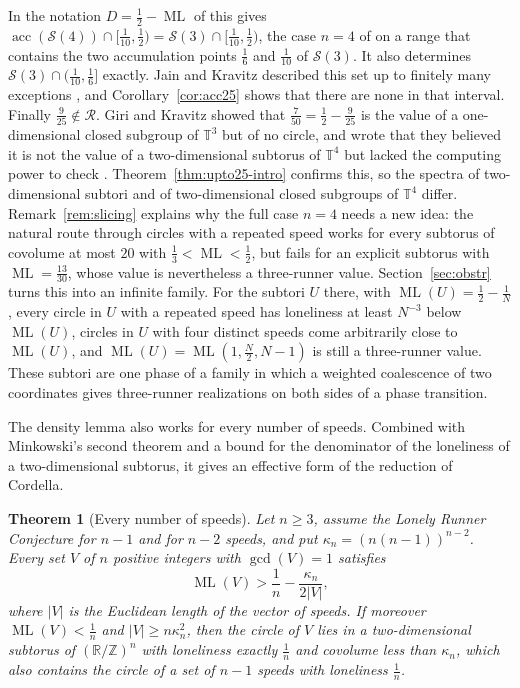 \documentclass[12pt]{amsart}
\newtheorem{theorem}{Theorem}[section]
\theoremstyle{definition}\newtheorem{definition}[theorem]{Definition}
\theoremstyle{remark}\newtheorem{remark}[theorem]{Remark}
\newcommand{\Z}{\mathbb Z}\newcommand{\R}{\mathbb R}\newcommand{\T}{\mathbb T}
\newcommand{\ML}{\operatorname{ML}}
\newcommand{\eucl}[1]{\lvert #1\rvert}
\begin{document}
In the notation $D=\frac12-\ML$ of \cite{GiriKravitz} this gives $\operatorname{acc}(\mathcal S(4))\cap[\frac1{10},\frac12)=\mathcal S(3)\cap[\frac1{10},\frac12)$, the case $n=4$ of \cite[Conjecture~1.5]{GiriKravitz} on a range that contains the two accumulation points $\frac16$ and $\frac1{10}$ of $\mathcal S(3)$. It also determines $\mathcal S(3)\cap(\frac1{10},\frac16]$ exactly. Jain and Kravitz described this set up to finitely many exceptions \cite[Theorem~1.4]{JainKravitz}, and Corollary~\ref{cor:acc25} shows that there are none in that interval. Finally $\frac9{25}\notin\mathcal R$. Giri and Kravitz showed that $\frac7{50}=\frac12-\frac9{25}$ is the value of a one-dimensional closed subgroup of $\T^3$ but of no circle, and wrote that they believed it is not the value of a two-dimensional subtorus of $\T^4$ but lacked the computing power to check \cite[Section~8]{GiriKravitz}. Theorem~\ref{thm:upto25-intro} confirms this, so the spectra of two-dimensional subtori and of two-dimensional closed subgroups of $\T^4$ differ. Remark~\ref{rem:slicing} explains why the full case $n=4$ needs a new idea: the natural route through circles with a repeated speed works for every subtorus of covolume at most $20$ with $\frac13<\ML<\frac12$, but fails for an explicit subtorus with $\ML=\frac{13}{30}$, whose value is nevertheless a three-runner value. Section~\ref{sec:obstr} turns this into an infinite family. For the subtori $U$ there, with $\ML(U)=\frac12-\frac1N$, every circle in $U$ with a repeated speed has loneliness at least $N^{-3}$ below $\ML(U)$, circles in $U$ with four distinct speeds come arbitrarily close to $\ML(U)$, and $\ML(U)=\ML(1,\frac N2,N-1)$ is still a three-runner value. These subtori are one phase of a family in which a weighted coalescence of two coordinates gives three-runner realizations on both sides of a phase transition.

The density lemma also works for every number of speeds. Combined with Minkowski's second theorem and a bound for the denominator of the loneliness of a two-dimensional subtorus, it gives an effective form of the reduction of Cordella.

\begin{theorem}[Every number of speeds]\label{thm:general-intro}
Let $n\ge3$, assume the Lonely Runner Conjecture for $n-1$ and for $n-2$ speeds, and put $\kappa_n=(n(n-1))^{n-2}$. Every set $V$ of $n$ positive integers with $\gcd(V)=1$ satisfies
\[
 \ML(V)>\frac1n-\frac{\kappa_n}{2\eucl V},
\]
where $\eucl V$ is the Euclidean length of the vector of speeds. If moreover $\ML(V)<\frac1n$ and $\eucl V\ge n\kappa_n^2$, then the circle of $V$ lies in a two-dimensional subtorus of $(\R/\Z)^n$ with loneliness exactly $\frac1n$ and covolume less than $\kappa_n$, which also contains the circle of a set of $n-1$ speeds with loneliness $\frac1n$.
\end{theorem}
\end{document}
